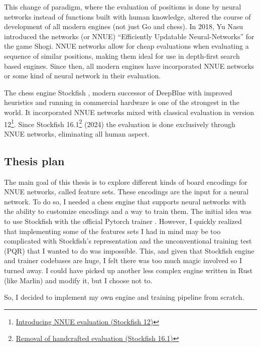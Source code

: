 This change of paradigm, where the evaluation of positions is done by neural networks instead of functions built with human knowledge, altered the course of development of all modern engines (not just Go and chess). In 2018, Yu Nasu introduced the networks  (or NNUE) ``Efficiently Updatable Neural-Networks'' \cite{nnue:2018} for the game Shogi. NNUE networks allow for cheap evaluations when evaluating a sequence of similar positions, making them ideal for use in depth-first search based engines. Since then, all modern engines have incorporated NNUE networks or some kind of neural network in their evaluation.

The chess engine Stockfish \cite{stockfish}, modern successor of DeepBlue with improved heuristics and running in commercial hardware is one of the strongest in the world. It incorporated NNUE networks mixed with classical evaluation in version 12\footnote[1]{\href{https://stockfishchess.org/blog/2020/introducing-nnue-evaluation/}{Introducing NNUE evaluation (Stockfish 12)}}. Since Stockfish 16.1\footnote[2]{\href{https://stockfishchess.org/blog/2024/stockfish-16-1/}{Removal of handcrafted evaluation (Stockfish 16.1)}} (2024) the evaluation is done exclusively through NNUE networks, eliminating all human aspect.

\newpage
\subsection{Thesis plan}

The main goal of this thesis is to explore different kinds of board encodings for NNUE networks, called feature sets. These encodings are the input for a neural network. To do so, I needed a chess engine that supports neural networks with the ability to customize encodings and a way to train them. The initial idea was to use Stockfish with the official Pytorch trainer \cite{nnue-pytorch}. However, I quickly realized that implementing some of the features sets I had in mind may be too complicated  with Stockfish's representation and the unconventional training test (PQR) that I wanted to do was impossible. This, and given that Stockfish engine and trainer codebases are huge, I felt there was too much magic involved so I turned away. I could have picked up another less complex engine written in Rust (like Marlin) and modify it, but I choose not to.

So, I decided to implement my own engine and training pipeline from scratch.
